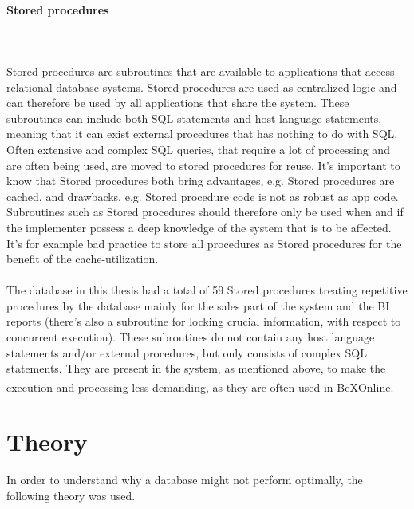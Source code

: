 \documentclass{cslthse-msc}
\newcommand{\bex}{BeX\textsuperscript{\textregistered}}
\begin{document}
\paragraph*{Stored procedures}\mbox{}\\\\ 
Stored procedures are subroutines that are available to applications that access relational database systems. Stored procedures are used as centralized logic and can therefore be used by all applications that share the system. These subroutines can include both SQL statements and host language statements, meaning that it can exist external procedures that has nothing to do with SQL. Often extensive and complex SQL queries, that require a lot of processing and are often being used, are moved to stored procedures for reuse\cite{StoredProcedures}. It's important to know that Stored procedures both bring advantages, e.g. Stored procedures are cached, and drawbacks, e.g. Stored procedure code is not as robust as app code. Subroutines such as Stored procedures should therefore only be used when and if the implementer possess a deep knowledge of the system that is to be affected. It's for example bad practice to store all procedures as Stored procedures for the benefit of the cache-utilization.\\\\
The database in this thesis had a total of 59 Stored procedures treating repetitive procedures by the database mainly for the sales part of the system and the BI reports (there's also a subroutine for locking crucial information, with respect to concurrent execution). These subroutines do not contain any host language statements and/or external procedures, but only consists of complex SQL statements. They are present in the system, as mentioned above, to make the execution and processing less demanding, as they are often used in \bex Online.

 
\section{Theory}
In order to understand why a database might not perform optimally, the following theory was used.
\end{document}

